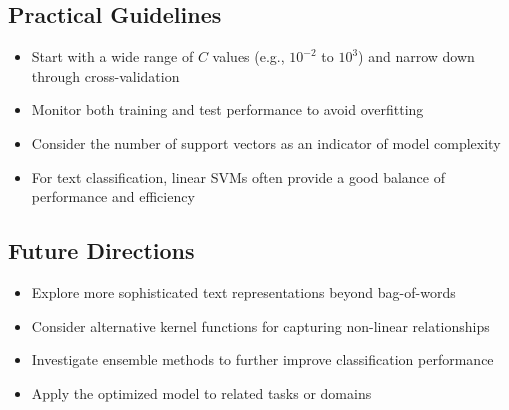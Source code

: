 \documentclass{article}
\begin{document}
\subsection{Practical Guidelines}
\begin{itemize}
    \item Start with a wide range of $C$ values (e.g., $10^{-2}$ to $10^3$) and narrow down through cross-validation
    \item Monitor both training and test performance to avoid overfitting
    \item Consider the number of support vectors as an indicator of model complexity
    \item For text classification, linear SVMs often provide a good balance of performance and efficiency
\end{itemize}

\subsection{Future Directions}
\begin{itemize}
    \item Explore more sophisticated text representations beyond bag-of-words
    \item Consider alternative kernel functions for capturing non-linear relationships
    \item Investigate ensemble methods to further improve classification performance
    \item Apply the optimized model to related tasks or domains
\end{itemize}
\end{document}

